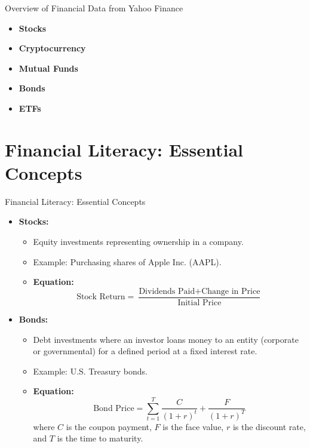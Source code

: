 \documentclass{beamer}
\begin{document}
\begin{frame}{Overview of Financial Data from Yahoo Finance}
    \begin{itemize}
        \item \textbf{Stocks}
        \item \textbf{Cryptocurrency}
        \item \textbf{Mutual Funds}
        \item \textbf{Bonds}
        \item \textbf{ETFs}
    \end{itemize}
\end{frame}

\section{Financial Literacy: Essential Concepts}
\begin{frame}{Financial Literacy: Essential Concepts}
    \begin{itemize}
        \item \textbf{Stocks:}
        \begin{itemize}
            \item Equity investments representing ownership in a company.
            \item Example: Purchasing shares of Apple Inc. (AAPL).
            \item \textbf{Equation:}
            \begin{equation*}
                \text{Stock Return} = \frac{\text{Dividends Paid} + \text{Change in Price}}{\text{Initial Price}}
            \end{equation*}
        \end{itemize}
        \item \textbf{Bonds:}
        \begin{itemize}
            \item Debt investments where an investor loans money to an entity (corporate or governmental) for a defined period at a fixed interest rate.
            \item Example: U.S. Treasury bonds.
            \item \textbf{Equation:}
            \begin{equation*}
                \text{Bond Price} = \sum_{t=1}^{T} \frac{C}{(1 + r)^t} + \frac{F}{(1 + r)^T}
            \end{equation*}
            where \( C \) is the coupon payment, \( F \) is the face value, \( r \) is the discount rate, and \( T \) is the time to maturity.
        \end{itemize}
    \end{itemize}
\end{frame}
\end{document}

